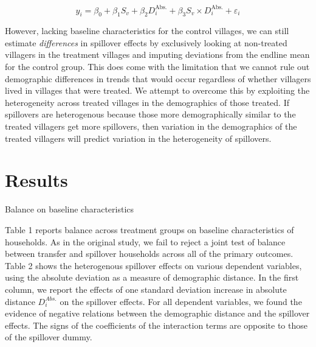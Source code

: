 \documentclass[11pt]{article}
\begin{document}
    \begin{equation*}
    y_i = \beta_0 + \beta_1 S_v + \beta_2 D^\text{Abs.}_i + \beta_3 S_v \times D^\text{Abs.}_i + \varepsilon_i
    \end{equation*}

    However, lacking baseline characteristics for the control villages, we can still estimate \textit{differences} in spillover effects by exclusively looking at non-treated villagers in the treatment villages and imputing deviations from the endline mean for the control group. This does come with the limitation that we cannot rule out demographic differences in trends that would occur regardless of whether villagers lived in villages that were treated. We attempt to overcome this by exploiting the heterogeneity across treated villages in the demographics of those treated. If spillovers are heterogenous because those more demographically similar to the treated villagers get more spillovers, then variation in the demographics of the treated villagers will predict variation in the heterogeneity of spillovers.


\section{Results}

    \begin{table}[H]
    \centering
    \caption{Balance on baseline characteristics}
    \end{table}

    Table 1 reports balance across treatment groups on baseline characteristics of households. As in the original study, we fail to reject a joint test of balance between transfer and spillover households across all of the primary outcomes. Table 2 shows the heterogenous spillover effects on various dependent variables, using the absolute deviation as a measure of demographic distance. In the first column, we report the effects of one standard deviation increase in absolute distance  $D_i^{Abs.}$ on the spillover effects. For all dependent variables, we found the evidence of negative relations between the demographic distance and the spillover effects. The signs of the coefficients of the interaction terms are opposite to those of the spillover dummy. \\
\end{document}
